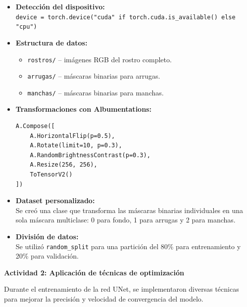 \begin{itemize}
  \item \textbf{Detección del dispositivo:}\\
  \texttt{device = torch.device("cuda" if torch.cuda.is\_available() else "cpu")}
  
  \item \textbf{Estructura de datos:}
  \begin{itemize}
    \item \texttt{rostros/} -- imágenes RGB del rostro completo.
    \item \texttt{arrugas/} -- máscaras binarias para arrugas.
    \item \texttt{manchas/} -- máscaras binarias para manchas.
  \end{itemize}

  \item \textbf{Transformaciones con Albumentations:}
\begin{verbatim}
A.Compose([
    A.HorizontalFlip(p=0.5),
    A.Rotate(limit=10, p=0.3),
    A.RandomBrightnessContrast(p=0.3),
    A.Resize(256, 256),
    ToTensorV2()
])
\end{verbatim}

  \item \textbf{Dataset personalizado:} \\
  Se creó una clase que transforma las máscaras binarias individuales en una sola máscara multiclase: 0 para fondo, 1 para arrugas y 2 para manchas.

  \item \textbf{División de datos:} \\
  Se utilizó \texttt{random\_split} para una partición del 80\% para entrenamiento y 20\% para validación.
\end{itemize}

\vspace{0.5cm}
\textbf{Actividad 2: Aplicación de técnicas de optimización}

Durante el entrenamiento de la red UNet, se implementaron diversas técnicas para mejorar la precisión y velocidad de convergencia del modelo.

